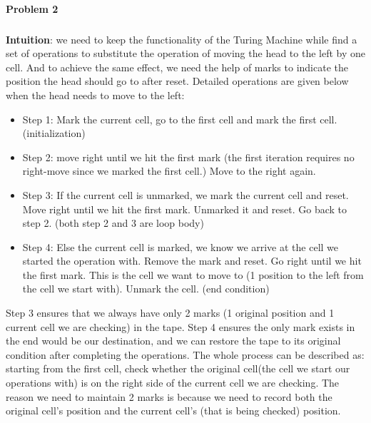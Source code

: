 \documentclass[12pt]{article}
\theoremstyle{definition}
\numberwithin{equation}{section}
\begin{document}
\newpage

\paragraph{Problem 2}
\subparagraph{} 
\textbf{Intuition}: we need to keep the functionality of the Turing Machine while find a set of operations to substitute the operation of moving the head to the left by one cell. And to achieve the same effect, we need the help of marks to indicate the position the head should go to after reset. Detailed operations are given below when the head needs to move to the left:
\begin{itemize}
\item Step 1: Mark the current cell, go to the first cell and mark the first cell. (initialization)
\item Step 2: move right until we hit the first mark (the first iteration requires no right-move since we marked the first cell.) Move to the right again.
\item Step 3: If the current cell is unmarked, we mark the current cell and reset. Move right until we hit the first mark. Unmarked it and reset. Go back to step 2. (both step 2 and 3 are loop body)
\item Step 4: Else the current cell is marked, we know we arrive at the cell we started the operation with. Remove the mark and reset. Go right until we hit the first mark. This is the cell we want to move to (1 position to the left from the cell we start with). Unmark the cell. (end condition)
\end{itemize}

Step 3 ensures that we always have only 2 marks (1 original position and 1 current cell we are checking) in the tape. Step 4 ensures the only mark exists in the end would be our destination, and we can restore the tape to its original condition after completing the operations. The whole process can be described as: starting from the first cell, check whether the original cell(the cell we start our operations with) is on the right side of the current cell we are checking. The reason we need to maintain 2 marks is because we need to record both the original cell's position and the current cell's (that is being checked) position.

\newpage
\end{document}
